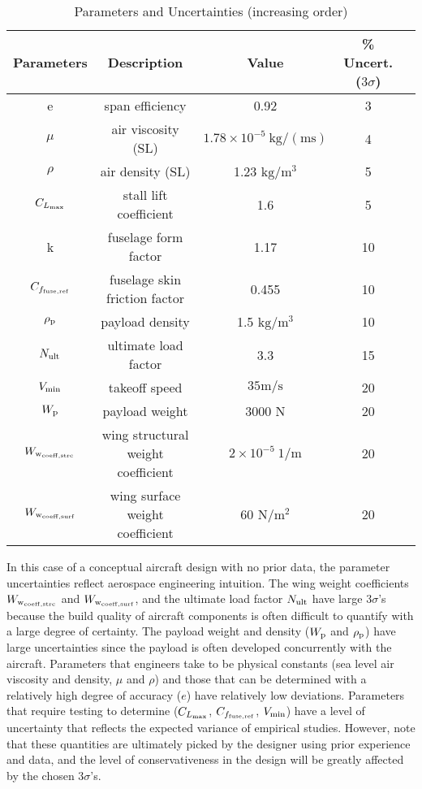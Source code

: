 \begin{table}
\begin{center}
\caption{\label{tab:uncertainties} Parameters and Uncertainties (increasing order)}
\begin{tabular}{c c c c c}
\hline
Parameters & Description & Value & \% Uncert. ($3\sigma$) \\
\hline
e & span efficiency & 0.92 & 3\\
$\mu$ & air viscosity (SL) & $1.78 \times 10^{-5}~\mathrm{kg/(ms)}$ & 4 \\
$\rho$ & air density (SL) & 1.23 $\mathrm{kg/m^3}$ & 5 \\
$C_{L_{\rm{max}}}$ & stall lift coefficient & 1.6 & 5\\
k & fuselage form factor & 1.17 & 10\\
$C_{f_{\rm{fuse, ref}}}$ & fuselage skin friction factor & 0.455 & 10 \\
$\rho_{\rm{p}}$ & payload density & 1.5 $\mathrm{kg/m^3}$ & 10 \\
$N_{\rm{ult}}$ & ultimate load factor & 3.3 & 15\\
$V_{\rm{min}}$ & takeoff speed & $35 \mathrm{m/s}$ & 20\\
$W_{\rm{p}}$ & payload weight & 3000 N & 20\\
$W_{\rm{w}_{\rm{coeff,strc}}}$ & wing structural weight coefficient & $2 \times 10^{-5}~1/\mathrm{m}$ & 20\\
$W_{\rm{w}_{\rm{coeff,surf}}}$ & wing surface weight coefficient & 60 $\mathrm{N/m^2}$ & 20\\
\hline
\end{tabular}
\end{center}
\end{table}

In this case of a conceptual aircraft design with no prior data,
the parameter uncertainties reflect aerospace engineering intuition.
{\color{blue} The wing weight coefficients $W_{\rm{w}_{\rm{coeff,strc}}}$ and $W_{\rm{w}_{\rm{coeff,surf}}}$,
and the ultimate load factor $N_{\rm{ult}}$ have
large $3\sigma$'s because the build quality of aircraft components is
often difficult to quantify with a large degree of certainty.
The payload weight and density ($W_{\rm{p}}$ and $\rho_{\rm{p}}$) have large uncertainties
since the payload is often developed concurrently with the aircraft.
Parameters that engineers take to be
physical constants (sea level air viscosity and density, $\mu$ and $\rho$) and those that can be determined with
a relatively high degree of accuracy ($e$) have relatively low deviations.
Parameters that require testing to determine ($C_{L_{\rm{max}}}$, $C_{f_{\rm{fuse, ref}}}$,
$V_{\rm{min}}$) have a level of uncertainty
that reflects the expected variance of empirical studies.} However, note that
these quantities are ultimately picked by the designer using prior experience and data,
and the level of conservativeness in the
design will be greatly affected by the chosen $3\sigma$'s.

